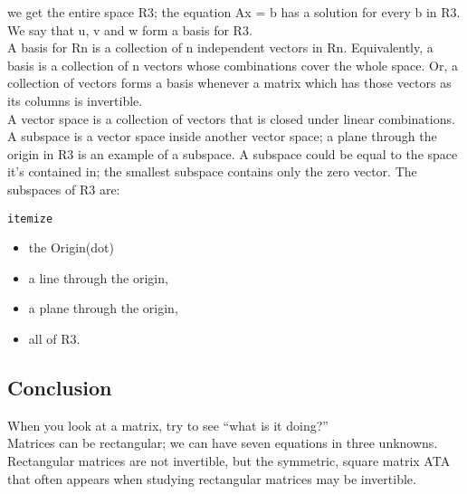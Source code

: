 \documentclass{article}
\begin{document}
we get the entire space R3; the equation Ax = b has a solution for every b in
R3. We say that u, v and w form a basis for R3.\\
A basis for Rn is a collection of n independent vectors in Rn. Equivalently,
a basis is a collection of n vectors whose combinations cover the whole space.
Or, a collection of vectors forms a basis whenever a matrix which has those
vectors as its columns is invertible.\\
A vector space is a collection of vectors that is closed under linear combinations. A subspace is a vector space inside another vector space; a plane through
the origin in R3 is an example of a subspace. A subspace could be equal to the
space it’s contained in; the smallest subspace contains only the zero vector.
The subspaces of R3 are:

\texttt{itemize}
\begin{itemize}
    \item the Origin(dot)
    \item a line through the origin,
    \item a plane through the origin,
    \item all of R3.
\end{itemize}


\subsection{Conclusion}
When you look at a matrix, try to see “what is it doing?”\\
Matrices can be rectangular; we can have seven equations in three unknowns. Rectangular matrices are not invertible, but the symmetric, square
matrix ATA that often appears when studying rectangular matrices may be
invertible. 
\end{document}
